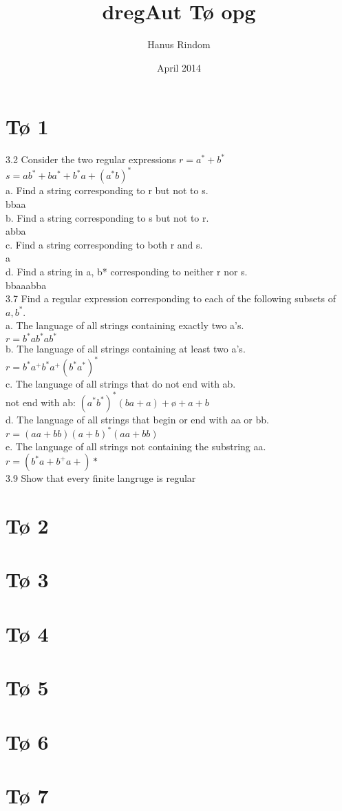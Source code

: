 \documentclass{article}
\title{dregAut Tø opg}
\author{Hanus Rindom}
\date{April 2014}
\begin{document}
\maketitle

\section{Tø 1}

3.2 Consider the two regular expressions
$r = a^*+b^*$\\
$s = ab^* + ba^* + b^*a + (a^*b)^*$\\
a. Find a string corresponding to r but not to s.\\
	bbaa\\
b. Find a string corresponding to s but not to r.\\
	abba\\
c. Find a string corresponding to both r and s.\\
	a\\
d. Find a string in {a, b}* corresponding to neither r nor s.\\
	bbaaabba\\

3.7 Find a regular expression corresponding to each of the following subsets of ${a, b}^*$.\\
a. The language of all strings containing exactly two a’s.\\
	$r=b^*ab^*ab^*$\\
b. The language of all strings containing at least two a’s.\\
	$r=b^*a^+b^*a^+(b^*a^*)^*$\\
c. The language of all strings that do not end with ab.\\
	not end with ab: $(a^*b^*)^*(ba+a)+ø+a+b$\\
d. The language of all strings that begin or end with aa or bb.\\
	$r=(aa+bb)(a+b)^*(aa+bb)$\\
e. The language of all strings not containing the substring aa.\\
	$r=(b^*a+b^+a+)*$\\
	
3.9 Show that every finite langruge is regular
    

\section{Tø 2}
\section{Tø 3}
\section{Tø 4}
\section{Tø 5}
\section{Tø 6}
\section{Tø 7}
\end{document}
